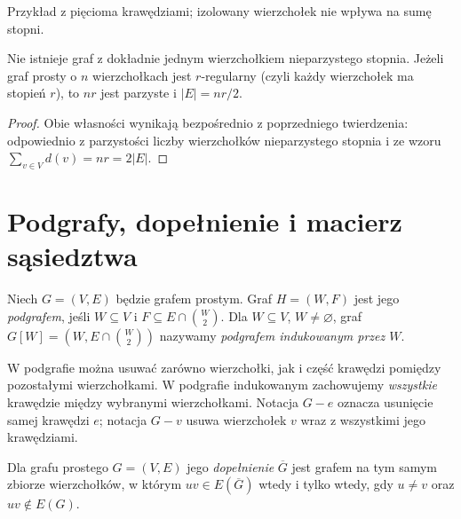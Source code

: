 \begin{center}

{\footnotesize Przykład z pięcioma krawędziami; izolowany
wierzchołek nie wpływa na sumę stopni.}
\end{center}

\begin{wniosek}
Nie istnieje graf z dokładnie jednym wierzchołkiem
nieparzystego stopnia. Jeżeli graf prosty o $n$
wierzchołkach jest $r$-regularny (czyli każdy wierzchołek
ma stopień $r$), to $nr$ jest parzyste i
$|E|=nr/2$.
\end{wniosek}

\begin{proof}
Obie własności wynikają bezpośrednio z poprzedniego
twierdzenia: odpowiednio z parzystości liczby
wierzchołków nieparzystego stopnia i ze wzoru
$\sum_{v\in V}d(v)=nr=2|E|$.
\end{proof}

\section{Podgrafy, dopełnienie i macierz sąsiedztwa}
\label{sec:tg-podgrafy}

\begin{definicja}
Niech $G=(V,E)$ będzie grafem prostym. Graf
$H=(W,F)$ jest jego \emph{podgrafem}, jeśli
$W\subseteq V$ i $F\subseteq E\cap\binom W2$.
Dla $W\subseteq V$, $W\ne\varnothing$, graf
$G[W]=(W,E\cap\binom W2)$ nazywamy
\emph{podgrafem indukowanym przez $W$}.
\end{definicja}

W podgrafie można usuwać zarówno wierzchołki, jak i część
krawędzi pomiędzy pozostałymi wierzchołkami. W podgrafie
indukowanym zachowujemy \emph{wszystkie} krawędzie między
wybranymi wierzchołkami. Notacja $G-e$ oznacza usunięcie
samej krawędzi $e$; notacja $G-v$ usuwa wierzchołek $v$
wraz z wszystkimi jego krawędziami.

\begin{definicja}[Dopełnienie]
Dla grafu prostego $G=(V,E)$ jego
\emph{dopełnienie} $\overline G$ jest grafem na
tym samym zbiorze wierzchołków, w którym
$uv\in E(\overline G)$ wtedy i tylko wtedy,
gdy $u\ne v$ oraz $uv\notin E(G)$.
\end{definicja}

